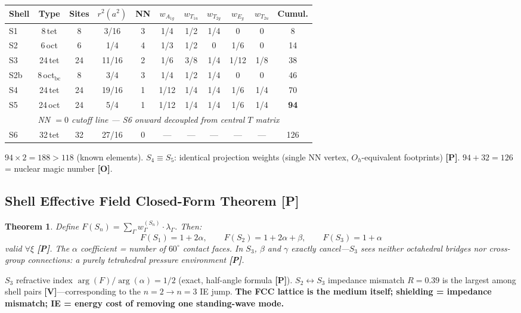 \documentclass[11pt,a4paper]{article}
\newtheorem{theorem}{Theorem}[section]
\newcommand{\gradeP}{\textbf{[P]}}
\newcommand{\gradeV}{\textbf{[V]}}
\newcommand{\gradeO}{\textbf{[O]}}
\begin{document}
\begin{center}
\begin{tabular}{lcccccccccc}
\toprule
Shell & Type & Sites & $r^2(a^2)$ & NN & $w_{A_{1g}}$ & $w_{T_{1u}}$ & $w_{T_{2g}}$ & $w_{E_g}$ & $w_{T_{2u}}$ & Cumul. \\
\midrule
S1 & 8\,tet & 8 & 3/16 & 3 & 1/4 & 1/2 & 1/4 & 0 & 0 & 8 \\
S2 & 6\,oct & 6 & 1/4 & 4 & 1/3 & 1/2 & 0 & 1/6 & 0 & 14 \\
S3 & 24\,tet & 24 & 11/16 & 2 & 1/6 & 3/8 & 1/4 & 1/12 & 1/8 & 38 \\
S2b & 8\,oct$_{\mathrm{bc}}$ & 8 & 3/4 & 3 & 1/4 & 1/2 & 1/4 & 0 & 0 & 46 \\
S4 & 24\,tet & 24 & 19/16 & 1 & 1/12 & 1/4 & 1/4 & 1/6 & 1/4 & 70 \\
S5 & 24\,oct & 24 & 5/4 & 1 & 1/12 & 1/4 & 1/4 & 1/6 & 1/4 & \textbf{94} \\
\midrule
\multicolumn{11}{c}{\textit{NN $= 0$ cutoff line --- S6 onward decoupled from central $T$ matrix}} \\
\midrule
S6 & 32\,tet & 32 & 27/16 & 0 & --- & --- & --- & --- & --- & 126 \\
\bottomrule
\end{tabular}
\end{center}

$94\times 2 = 188 > 118$ (known elements). $S_4 \equiv S_5$: identical projection weights (single NN vertex, $O_h$-equivalent footprints) \gradeP. $94 + 32 = 126$ = nuclear magic number \gradeO.

\subsection{Shell Effective Field Closed-Form Theorem \gradeP}\label{sec:shellfield}

\begin{theorem}
Define $F(S_n) = \sum_\Gamma w_\Gamma^{(S_n)}\cdot\lambda_\Gamma$. Then:
$$F(S_1) = 1 + 2\alpha, \qquad F(S_2) = 1 + 2\alpha + \beta, \qquad F(S_3) = 1 + \alpha$$
valid $\forall\xi$ \gradeP. The $\alpha$ coefficient = number of $60^\circ$ contact faces. In $S_3$, $\beta$ and $\gamma$ exactly cancel---$S_3$ sees neither octahedral bridges nor cross-group connections: a purely tetrahedral pressure environment \gradeP.
\end{theorem}

$S_3$ refractive index $\arg(F)/\arg(\alpha) = 1/2$ (exact, half-angle formula \gradeP). $S_2\leftrightarrow S_3$ impedance mismatch $R = 0.39$ is the largest among shell pairs \gradeV---corresponding to the $n{=}2\to n{=}3$ IE jump. \textbf{The FCC lattice is the medium itself; shielding = impedance mismatch; IE = energy cost of removing one standing-wave mode.}
\end{document}
